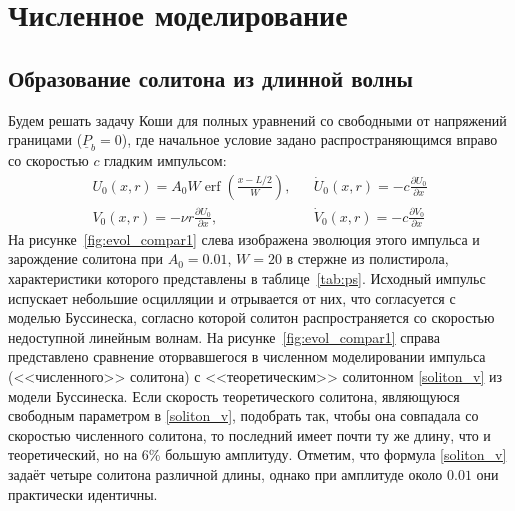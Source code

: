 \documentclass[12pt, a4paper]{report}
\DeclareMathOperator{\erf}{erf}
\newcommand{\lb}{\left (}
\newcommand{\rb}{\right )}
\newcommand{\vect}[1]{\underline{#1}}
\newcommand{\pdiff}[2]{\frac{\partial #1}{\partial #2}}
\begin{document}
\section{Численное моделирование}

\subsection{Образование солитона из длинной волны}
Будем решать задачу Коши для полных уравнений со свободными от напряжений границами ($\vect{P}_b=0$), где начальное условие задано распространяющимся вправо со скоростью $c$ гладким импульсом:
\begin{align}
\label{3_ic_u}
& U_0 (x, r) = A_0 W \erf\lb \frac{x - L/2}{W}\rb,&  &\dot{U}_0 (x, r) = -c \pdiff{U_0}{x}&\\
\label{3_ic_v}
& V_0(x, r) = -\nu r \pdiff{U_0}{x},& &\dot{V}_0 (x, r) = -c \pdiff{V_0}{x}&
\end{align}
На рисунке~\ref{fig:evol_compar1} слева изображена эволюция этого импульса и зарождение солитона при $A_0=0.01$, $W=20$ в стержне из полистирола, характеристики которого представлены в таблице~\ref{tab:ps}. Исходный импульс испускает небольшие осцилляции и отрывается от них, что согласуется с моделью Буссинеска, согласно которой солитон распространяется со скоростью недоступной линейным волнам. На рисунке~\ref{fig:evol_compar1} справа представлено сравнение оторвавшегося в численном моделировании импульса (<<численного>> солитона) с <<теоретическим>> солитонном \eqref{soliton_v} из модели Буссинеска. Если скорость теоретического солитона, являющуюся свободным параметром в \eqref{soliton_v}, подобрать так, чтобы она совпадала со скоростью численного солитона, то последний имеет почти ту же длину, что и теоретический, но на 6\% большую амплитуду. Отметим, что формула \eqref{soliton_v} задаёт четыре солитона различной длины, однако при амплитуде около $0.01$ они практически идентичны.
\end{document}
